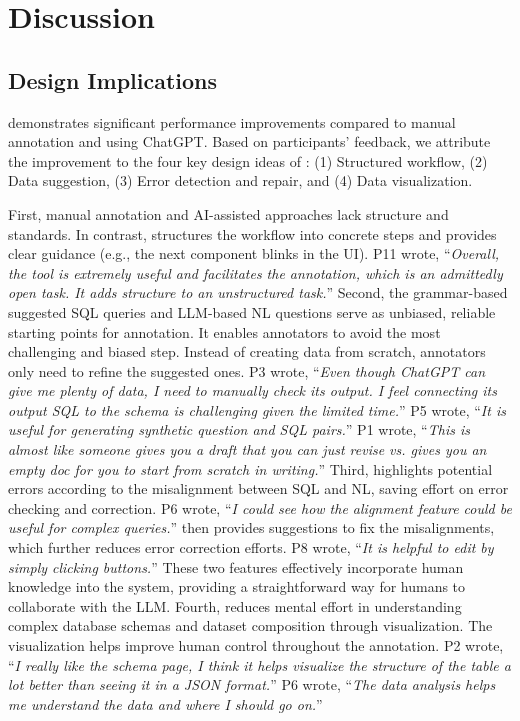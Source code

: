 \section{Discussion}

\subsection{Design Implications}

{\tool} demonstrates significant performance improvements compared to manual annotation and using ChatGPT. Based on participants' feedback, we attribute the improvement to the four key design ideas of {\tool}: (1) Structured workflow, (2) Data suggestion, (3) Error detection and repair, and (4) Data visualization. 

First, manual annotation and AI-assisted approaches lack structure and standards. In contrast, {\tool} structures the workflow into concrete steps and provides clear guidance (e.g., the next component blinks in the UI).
P11 wrote, ``\textit{Overall, the tool is extremely useful and facilitates the annotation, which is an admittedly open task. It adds structure to an unstructured task.}''
Second, the grammar-based suggested SQL queries and LLM-based NL questions serve as unbiased, reliable starting points for annotation. It enables annotators to avoid the most challenging and biased step. Instead of creating data from scratch, annotators only need to refine the suggested ones.
P3 wrote, ``\textit{Even though ChatGPT can give me plenty of data, I need to manually check its output. I feel connecting its output SQL to the schema is challenging given the limited time.}''
P5 wrote, ``\textit{It is useful for generating synthetic question and SQL pairs.}''
P1 wrote, ``\textit{This is almost like someone gives you a draft that you
can just revise vs. gives you an empty doc for you to start from scratch in writing.}''
Third, {\tool} highlights potential errors according to the misalignment between SQL and NL, saving effort on error checking and correction. 
P6 wrote, ``\textit{I could see how the alignment feature could be useful for complex queries.}''
{\tool} then provides suggestions to fix the misalignments, which further reduces error correction efforts.
P8 wrote, ``\textit{It is helpful to edit by simply clicking buttons.}''
These two features effectively incorporate human knowledge into the system, providing a straightforward way for humans to collaborate with the LLM.
Fourth, {\tool} reduces mental effort in understanding complex database schemas and dataset composition through visualization.
The visualization helps improve human control throughout the annotation.
P2 wrote, ``\textit{I really like the schema page, I think it helps visualize the structure of the table a lot better than seeing it in a JSON format.}''
P6 wrote, ``\textit{The data analysis helps me understand the data and where I should go on.}''

